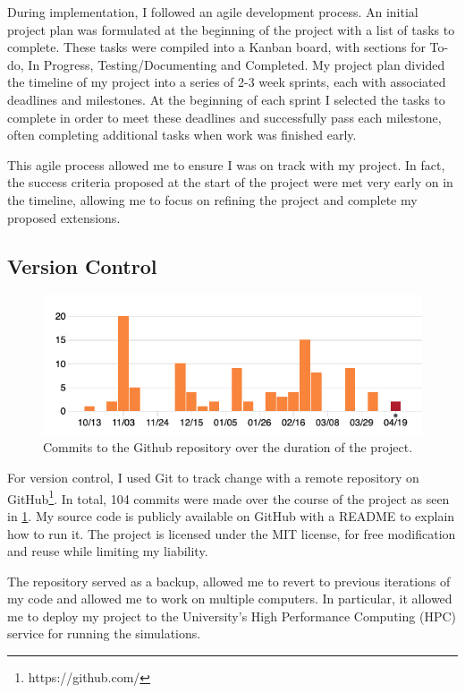 \documentclass[12pt,a4paper]{report}
\begin{document}
During implementation, I followed an agile development process. An initial project plan was formulated at the beginning of the project with a list of tasks to complete. These tasks were compiled into a Kanban board, with sections for To-do, In Progress, Testing/Documenting and Completed. My project plan divided the timeline of my project into a series of 2-3 week sprints, each with associated deadlines and milestones. At the beginning of each sprint I selected the tasks to complete in order to meet these deadlines and successfully pass each milestone, often completing additional tasks when work was finished early.

This agile process allowed me to ensure I was on track with my project. In fact, the success criteria proposed at the start of the project were met very early on in the timeline, allowing me to focus on refining the project and complete my proposed extensions.

\subsection{Version Control}

\begin{figure}[t]
  \centering
  \includegraphics[width=.9\linewidth]{figs/commits.jpg}
  \caption{Commits to the Github repository over the duration of the project.}
  \label{fig:commits}
\end{figure}

For version control, I used Git to track change with a remote repository on GitHub\footnote{https://github.com/}. In total, 104 commits were made over the course of the project as seen in \cref{fig:commits}. My source code is publicly available on GitHub with a README to explain how to run it. The project is licensed under the MIT license, for free modification and reuse while limiting my liability.

The repository served as a backup, allowed me to revert to previous iterations of my code and allowed me to work on multiple computers. In particular, it allowed me to deploy my project to the University's High Performance Computing (HPC) service for running the simulations.
\end{document}
